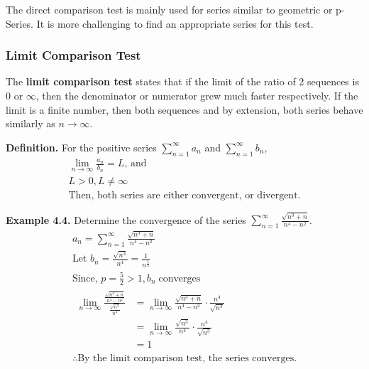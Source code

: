 \documentclass[12pt]{article}
\begin{document}
The direct comparison test is mainly used for series similar to geometric or p-Series. It is more challenging to find an appropriate series for this test.

\subsubsection{Limit Comparison Test}

The \textbf{limit comparison test} states that if the limit of the ratio of 2 sequences is $0$ or $\infty$, then the denominator or numerator grew much faster respectively. If the limit is a finite number, then both sequences and by extension, both series behave similarly as $n \rightarrow \infty$.

\textbf{Definition. } For the positive series $\displaystyle\sum_{n=1}^{\infty}a_n$ and $\displaystyle\sum_{n=1}^{\infty}b_n$,
\begin{gather*}
	\displaystyle\lim_{n\rightarrow\infty}\frac{a_n}{b_n}=L \text{, and} \\
	L > 0, L \neq \infty  \\
	\text{Then, both series are either convergent, or divergent.}
\end{gather*}

\textbf{Example 4.4.} Determine the convergence of the series $\displaystyle\sum_{n=1}^{\infty}\frac{\sqrt{n^3+n}}{n^4-n^2}$.
\begin{gather*}
	a_n = \displaystyle\sum_{n=1}^{\infty}\frac{\sqrt{n^3+n}}{n^4-n^2}  \\
	\text{Let } b_n = \frac{\sqrt{n^3}}{n^4} = \frac{1}{n^{\frac{5}{2}}} \\
	\text{Since, } p = \frac{5}{2} > 1, b_n \; \text{converges} \\
	\begin{aligned}
		\displaystyle\lim_{n\rightarrow\infty}\frac{\frac{\sqrt{n^3+n}}{n^4-n^2}}{\frac{\sqrt{n^3}}{n^4}} & = \displaystyle\lim_{n\rightarrow\infty}\frac{\sqrt{n^3+n}}{n^4-n^2} \cdot \frac{n^4}{\sqrt{n^3}} \\
		                                                                                                  & = \displaystyle\lim_{n\rightarrow\infty}\frac{\sqrt{n^3}}{n^4} \cdot \frac{n^4}{\sqrt{n^3}}       \\
		                                                                                                  & = 1
	\end{aligned} \\
	\therefore \text{By the limit comparison test, the series converges.}
\end{gather*}
\end{document}
